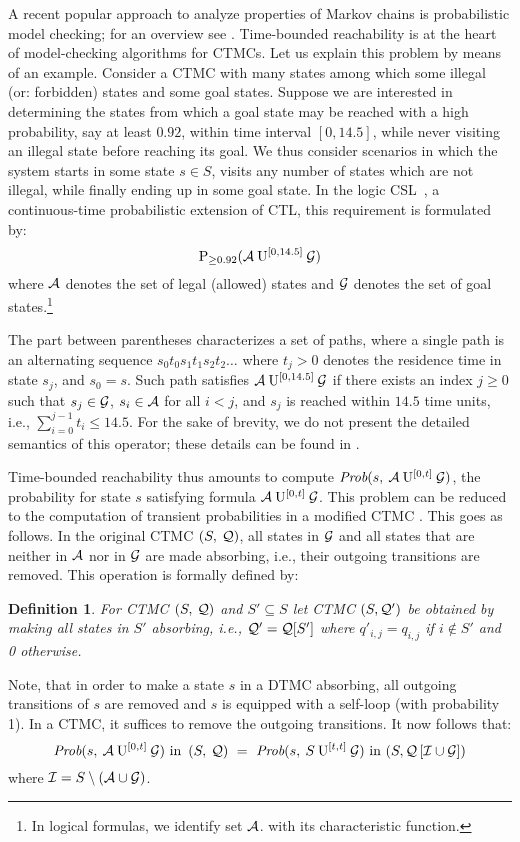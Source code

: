 \documentclass[times, 10pt,twocolumn]{article}
\newtheorem{definition}{Definition}
\begin{document}

		A recent popular approach to analyze properties of Markov chains is probabilistic model checking; for an overview see \cite{Kwiatkowska_SLCS03}.  Time-bounded reachability is at the heart of model-checking algorithms for CTMCs.  Let us explain this problem by means of an example. Consider a CTMC with many states among which some illegal (or: forbidden) states and some goal states.  Suppose we are interested in determining the states from which a goal state may be reached with a high probability, say at least $0.92$, within time interval $[0,14.5]$, while never visiting an illegal state before reaching its goal. We thus consider scenarios in which the system starts in some state $s \in S$, visits any number of states which are not illegal, while finally ending up in some goal state.  In the logic CSL~\cite{AzizSSB_ACMTCL00,BaierHHK_TSE03}, a continuous-time probabilistic extension of CTL,  this requirement is formulated by:
		\[
			\mathrm{P}_{\geq 0.92}(\mathcal{A} \: \mathrm{U}^{[0,14.5]} \: \mathcal{G})
		\]
		where $\mathcal{A}$ denotes the set of legal (allowed) states and $\mathcal{G}$ denotes the set of goal states.\footnote{In logical formulas, we identify set $\mathcal{A}$. with its characteristic function.}
		
		The part between parentheses characterizes a set of paths, where a single path is an alternating sequence $s_{0}t_{0}s_{1}t_{1}s_{2}t_{2}\ldots$ where $t_{j} > 0$ denotes the residence time in state $s_{j}$, and $s_{0} = s$.  Such path satisfies $\mathcal{A} \: \mathrm{U}^{[0,14.5]} \: \mathcal{G}$ if there exists an index $j \geq 0$ such that $s_{j} \in \mathcal{G}$, $s_i \in \mathcal{A}$ for all $i < j$, and $s_{j}$ is reached within $14.5$ time units, i.e., $\sum_{i=0}^{j{-}1}t_{i} \leq 14.5$.  For the sake of brevity, we do not present the detailed semantics of this operator; these details can be found in \cite{AzizSSB_ACMTCL00,BaierHHK_TSE03}.
	
		Time-bounded reachability thus amounts to compute $\mbox{\it Prob}(s, \: \mathcal{A} \: \mathrm{U}^{[0,t]} \: \mathcal{G} )$, the probability for state $s$ satisfying formula $\mathcal{A} \: \mathrm{U}^{[0,t]} \: \mathcal{G}$.  This problem can be reduced to the computation of transient probabilities in a modified CTMC \cite{BaierHHK_TSE03}.  This goes as follows.  In the original CTMC $\left( S,\: \mathcal{Q} \right)$, all states in $\mathcal{G}$ and all states that are neither in $\mathcal{A}$ nor in $\mathcal{G}$ are made absorbing, i.e., their outgoing transitions are removed.   This operation is formally defined by:		
		\begin{definition}
		For CTMC $\left( S,\: \mathcal{Q} \right)$ and $S' \subseteq S$ let CTMC $(S, \mathcal{Q}')$  be obtained by making all states in $S'$ absorbing, i.e., $\mathcal{Q}' = \mathcal{Q}[S']$ where $q'_{i,j} = q_{i,j}$ if $i \not\in S'$ and 0 otherwise.
		\end{definition}
		Note, that in order to make a state $s$ in a DTMC absorbing, all outgoing transitions of $s$ are removed and $s$ is equipped with a self-loop (with probability 1).  In a CTMC, it suffices to remove the outgoing transitions.  It now follows that:
		{\small
		\[
			\PsaUg{s}{0}{t} \mbox{ in } \CTMC \ = \ \PsSUg{s}{t}{t} \mbox{ in } (S, \mQnavg)
		\]
		}
		where $\mathcal{I}=S \setminus \left( \mathcal{A} \cup \mathcal{G}\right)$.
		
\end{document}
